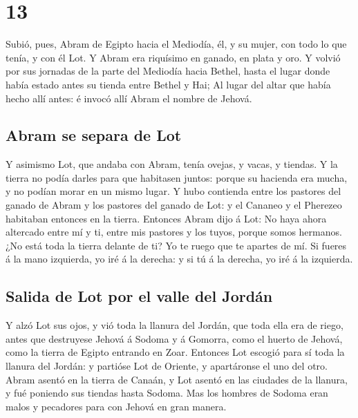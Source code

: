 \hypertarget{section-01-13}{%
\section{13}\label{section-01-13}}

 Subió, pues, Abram de Egipto hacia el Mediodía, él, y su
mujer, con todo lo que tenía, y con él Lot.  Y Abram era
riquísimo en ganado, en plata y oro.  Y volvió por sus
jornadas de la parte del Mediodía hacia Bethel, hasta el lugar donde
había estado antes su tienda entre Bethel y Hai;  Al lugar
del altar que había hecho allí antes: é invocó allí Abram el nombre de
Jehová.

\hypertarget{abram-se-separa-de-lot}{%
\subsection{Abram se separa de Lot}\label{abram-se-separa-de-lot}}

 Y asimismo Lot, que andaba con Abram, tenía ovejas, y
vacas, y tiendas.  Y la tierra no podía darles para que
habitasen juntos: porque su hacienda era mucha, y no podían morar en un
mismo lugar.  Y hubo contienda entre los pastores del
ganado de Abram y los pastores del ganado de Lot: y el Cananeo y el
Pherezeo habitaban entonces en la tierra.  Entonces Abram
dijo á Lot: No haya ahora altercado entre mí y ti, entre mis pastores y
los tuyos, porque somos hermanos.  ¿No está toda la tierra
delante de ti? Yo te ruego que te apartes de mí. Si fueres á la mano
izquierda, yo iré á la derecha: y si tú á la derecha, yo iré á la
izquierda.

\hypertarget{salida-de-lot-por-el-valle-del-jorduxe1n}{%
\subsection{Salida de Lot por el valle del
Jordán}\label{salida-de-lot-por-el-valle-del-jorduxe1n}}

 Y alzó Lot sus ojos, y vió toda la llanura del Jordán,
que toda ella era de riego, antes que destruyese Jehová á Sodoma y á
Gomorra, como el huerto de Jehová, como la tierra de Egipto entrando en
Zoar.  Entonces Lot escogió para sí toda la llanura del
Jordán: y partióse Lot de Oriente, y apartáronse el uno del otro.
 Abram asentó en la tierra de Canaán, y Lot asentó en las
ciudades de la llanura, y fué poniendo sus tiendas hasta Sodoma.
 Mas los hombres de Sodoma eran malos y pecadores para
con Jehová en gran manera.

